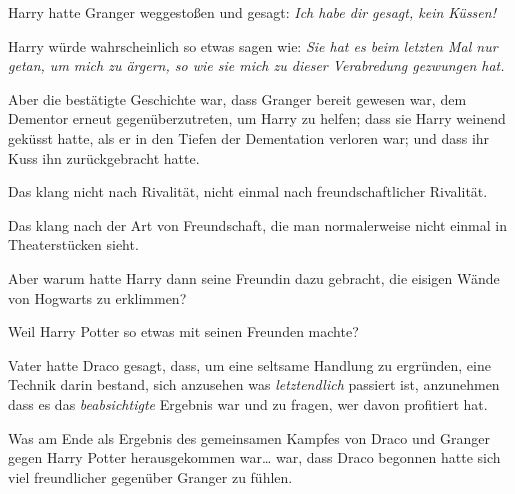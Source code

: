 Harry hatte Granger weggestoßen und gesagt: \emph{Ich habe dir gesagt, kein Küssen!}

Harry würde wahrscheinlich so etwas sagen wie: \emph{Sie hat es beim letzten Mal nur getan, um mich zu ärgern, so wie sie mich zu dieser Verabredung gezwungen hat.}

Aber die bestätigte Geschichte war, dass Granger bereit gewesen war, dem Dementor erneut gegenüberzutreten, um Harry zu helfen; dass sie Harry weinend geküsst hatte, als er in den Tiefen der Dementation verloren war; und dass ihr Kuss ihn zurückgebracht hatte.

Das klang nicht nach Rivalität, nicht einmal nach freundschaftlicher Rivalität.

Das klang nach der Art von Freundschaft, die man normalerweise nicht einmal in Theaterstücken sieht.

Aber warum hatte Harry dann seine Freundin dazu gebracht, die eisigen Wände von Hogwarts zu erklimmen?

Weil Harry Potter so etwas mit seinen Freunden machte?

Vater hatte Draco gesagt, dass, um eine seltsame Handlung zu ergründen, eine Technik darin bestand, sich anzusehen was \emph{letztendlich} passiert ist, anzunehmen dass es das \emph{beabsichtigte} Ergebnis war und zu fragen, wer davon profitiert hat.

Was am Ende als Ergebnis des gemeinsamen Kampfes von Draco und Granger gegen Harry Potter herausgekommen war… war, dass Draco begonnen hatte sich viel freundlicher gegenüber Granger zu fühlen.

